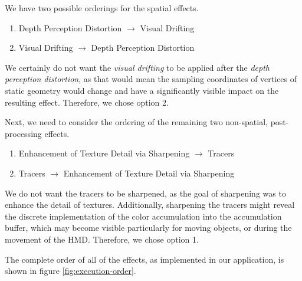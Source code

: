 We have two possible orderings for the spatial effects.

\begin{enumerate}
    \item Depth Perception Distortion $\to$ Visual Drifting
    \item Visual Drifting $\to$ Depth Perception Distortion
\end{enumerate}

We certainly do not want the \textit{visual drifting} to be applied after the \textit{depth perception distortion}, as that would mean the sampling coordinates of vertices of static geometry would change and have a significantly visible impact on the resulting effect. Therefore, we chose option 2.

Next, we need to consider the ordering of the remaining two non-spatial, post-processing effects.

\begin{enumerate}
    \item Enhancement of Texture Detail via Sharpening $\to$ Tracers
    \item Tracers $\to$ Enhancement of Texture Detail via Sharpening
\end{enumerate}

We do not want the tracers to be sharpened, as the goal of sharpening was to enhance the detail of textures. Additionally, sharpening the tracers might reveal the discrete implementation of the color accumulation into the accumulation buffer, which may become visible particularly for moving objects, or during the movement of the \ac{HMD}. Therefore, we chose option 1.

The complete order of all of the effects, as implemented in our application, is shown in figure \ref{fig:execution-order}.

